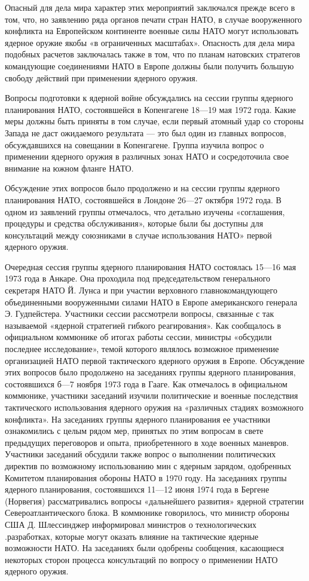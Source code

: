 \documentclass[12pt, a4paper, openany]{book}
\begin{document}
	Опасный для дела мира характер этих мероприятий заключался прежде всего в том, что, но заявлению ряда органов печати стран НАТО, в случае вооруженного конфликта на Европейском континенте военные силы НАТО могут использовать ядерное оружие якобы «в ограниченных масштабах». Опасность для дела мира подобных расчетов заключалась также в том, что по планам натовских стратегов командующие соединениями НАТО в Европе должны были получить большую свободу действий при применении ядерного оружия.
	
	Вопросы подготовки к ядерной войне обсуждались на сессии группы ядерного планирования НАТО, состоявшейся в Копенгагене 18—19 мая 1972 года. Какие меры должны быть приняты в том случае, если первый атомный удар со стороны Запада не даст ожидаемого результата — это был один из главных вопросов, обсуждавшихся на совещании в Копенгагене. Группа изучила вопрос о применении ядерного оружия в различных зонах НАТО и сосредоточила свое внимание на южном фланге НАТО.
	
	Обсуждение этих вопросов было продолжено и на сессии группы ядерного планирования НАТО, состоявшейся в Лондоне 26—27 октября 1972 года. В одном из заявлений группы отмечалось, что детально изучены «соглашения, процедуры и средства обслуживания», которые были бы доступны для консультаций между союзниками в случае использования НАТО» первой ядерного оружия.
	
	Очередная сессия группы ядерного планирования НАТО состоялась 15—16 мая 1973 года в Анкаре. Она проходила под председательством генерального секретаря НАТО Й. Лунса и при участии верховного главнокомандующего объединенными вооруженными силами НАТО в Европе американского генерала Э. Гудпейстера. Участники сессии рассмотрели вопросы, связанные с так называемой «ядерной стратегией гибкого реагирования». Как сообщалось в официальном коммюнике об итогах работы сессии, министры «обсудили последнее исследование», темой которого являлось возможное применение организацией НАТО первой тактического ядерного оружия в Европе. Обсуждение этих вопросов было продолжено на заседаниях группы ядерного планирования, состоявшихся б—7 ноября 1973 года в Гааге. Как отмечалось в официальном коммюнике, участники заседаний изучили политические и военные последствия тактического использования ядерного оружия на «различных стадиях возможного конфликта». На заседаниях группы ядерного планирования ее участники ознакомились с целым рядом мер, принятых по этим вопросам в свете предыдущих переговоров и опыта, приобретенного в ходе военных маневров. Участники заседаний обсудили также вопрос о выполнении политических директив по возможному использованию мин с ядерным зарядом, одобренных Комитетом планирования обороны НАТО в 1970 году. На заседаниях группы ядерного планирования, состоявшихся 11—12 июня 1974 года в Бергене (Норвегия) рассматривались вопросы «дальнейшего развития» ядерной стратегии Североатлантического блока. В коммюнике говорилось, что министр обороны США Д. Шлессинджер информировал министров о технологических .разработках, которые могут оказать влияние на тактические ядерные возможности НАТО. На заседаниях были одобрены сообщения, касающиеся некоторых сторон процесса консультаций по вопросу о применении НАТО ядерного оружия.
	
\end{document}
